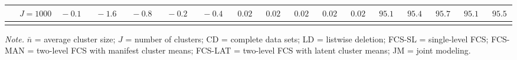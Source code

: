 \begin{sidewaystable}
\begin{threeparttable}
\begin{tabular}{llccccccccccccccc}
 & \nopagebreak $\;J=1000$  & $\phantom{0}{-}0.1\phantom{0}$ & $\phantom{0}{-}1.6\phantom{0}$ & $\phantom{0}{-}0.8\phantom{0}$ & $\phantom{0}{-}0.2\phantom{0}$ & $\phantom{0}{-}0.4\phantom{0}$ & $\phantom{0}0.02\phantom{0}$ & $\phantom{0}0.02\phantom{0}$ & $\phantom{0}0.02\phantom{0}$ & $\phantom{0}0.02\phantom{0}$ & $\phantom{0}0.02\phantom{0}$ & $\phantom{0}95.1\phantom{0}$ & $\phantom{0}95.4\phantom{0}$ & $\phantom{0}95.7\phantom{0}$ & $\phantom{0}95.1\phantom{0}$ & $\phantom{0}95.5\phantom{0}$ \\
[0.5ex]\hline\\[-1.6ex] 
\end{tabular}
\begin{tablenotes}{\footnotesize \textit{Note.} $\bar{n}$ = average cluster size; $J$ = number of clusters; CD = complete data sets; LD = listwise deletion; FCS-SL = single-level FCS; FCS-MAN = two-level FCS with manifest cluster means; FCS-LAT = two-level FCS with latent cluster means; JM = joint modeling.}\end{tablenotes}
\end{threeparttable}
\end{sidewaystable}
